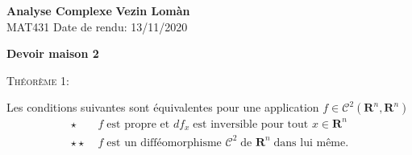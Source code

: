 \documentclass[12pt]{article}
\newenvironment{statement}[1]
{\begin{mdframed}[linewidth=0.6pt]
        \textsc{Théorème #1:}

}
    {\end{mdframed}}
\newcommand{\R}{\mathbf{R}}
\begin{document}
        \noindent
\textbf{Analyse Complexe} \hfill \textbf{Vezin Lomàn}\\
\normalsize MAT431 \hfill Date de rendu: 13/11/2020\\

\begin{center}
\textbf{Devoir maison 2}
\end{center}

\begin{statement}{1}
        Les conditions suivantes sont équivalentes pour une application $f \in \mathcal{C}^{2}(\R^{n}, \R^{n})$ 
        \begin{align*}
                \star \; & f \; \text{est propre et } df_{x} \; \text{est inversible pour tout } x \in \R^{n} \\
                \star \star \; & f \; \text{est un difféomorphisme } \mathcal{C}^{2} \; \text{de } \R^{n} \; \text{dans lui même} 
        .\end{align*}
\end{statement}
\end{document}
